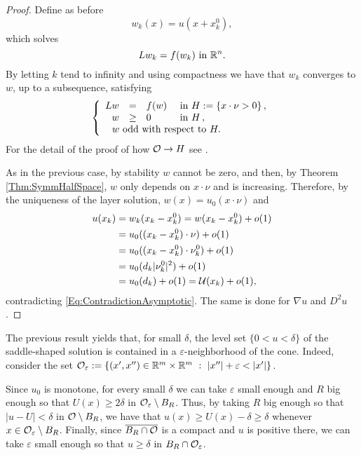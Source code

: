 \begin{proof}
Define as before
$$ w_k (x) = u(x+x_k^0), $$
which solves
$$ L w_k = f(w_k) \ \text{in } \mathbb{R}^n. $$
By letting $k$ tend to infinity and using compactness  we have that $w_k$ converges to $w$, up to a subsequence, satisfying
$$
\beqc{\PDEsystem}
L w &=& f(w)  &\textrm{ in } H:=\{x\cdot \nu >0\}\,,\\
w &\geq& 0  &\textrm{ in } H\,,\\
\,\,w \text{ odd with respect to } H. \span\span\span \,
\eeqc
$$
For the detail of the proof of how $\mathcal{O} \rightarrow H$ see \cite{CabreTerra1}.

As in the previous case, by stability $w$ cannot be zero, and then, by Theorem \ref{Thm:SymmHalfSpace}, $w$ only depends on $x\cdot \nu$ and is increasing. Therefore, by the uniqueness of the layer solution, $w(x) = u_0(x\cdot \nu)$ and
\begin{align*}
u(x_k) &= w_k(x_k-x_k^0) = w(x_k-x_k^0) + o(1) \\
&= u_0((x_k-x_k^0)\cdot \nu) + o(1) \\
&= u_0((x_k-x_k^0)\cdot \nu_k^0) + o(1) \\
&= u_0(d_k |\nu_k^0|^2) + o(1) \\
&= u_0(d_k) + o(1) = \mathcal{U} (x_k) + o(1),
\end{align*}
contradicting \eqref{Eq:ContradictionAsymptotic}. The same is done for $\nabla u$ and $D^2 u$.
\end{proof}

\begin{remark}
	The previous result yields that, for small $\delta$, the level set $\{0<u<\delta\}$ of the saddle-shaped solution is contained in a $\varepsilon$-neighborhood of the cone. Indeed, consider the set $\ocal_\varepsilon := \{(x',x'')\in \R^m\times\R^m \ : \ |x''|+\varepsilon <|x'| \}$. 
	
	Since $u_0$ is monotone, for every small $\delta$ we can take $\varepsilon$ small enough and $R$ big enough so that $U(x)\geq 2\delta$ in $\mathcal{O}_\varepsilon \setminus B_R$. Thus, by taking $R$ big enough so that $|u-U|< \delta$ in $\mathcal{O} \setminus B_R$, we have that $u(x) \geq U(x)-\delta \geq \delta$ whenever $x\in \mathcal{O}_\varepsilon \setminus B_R$. Finally, since $\overline{B_R \cap \mathcal{O}}$ is a compact and $u$ is positive there, we can take $\varepsilon$ small enough so that $u\geq \delta$ in $B_R\cap \mathcal{O}_\varepsilon$.
\end{remark}